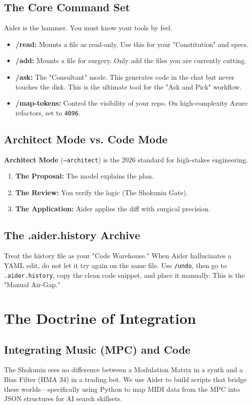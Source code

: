 \documentclass[11pt,a4paper,oneside]{book}
\begin{document}
\section{The Core Command Set}
Aider is the hammer. You must know your tools by feel.
\begin{itemize}
    \item \textbf{/read:} Mounts a file as read-only. Use this for your "Constitution" and specs.
    \item \textbf{/add:} Mounts a file for surgery. Only add the files you are currently cutting.
    \item \textbf{/ask:} The "Consultant" mode. This generates code in the chat but never touches the disk. This is the ultimate tool for the "Ask and Pick" workflow.
    \item \textbf{/map-tokens:} Control the visibility of your repo. On high-complexity Azure refactors, set to \texttt{4096}.
\end{itemize}

\section{Architect Mode vs. Code Mode}
\textbf{Architect Mode} (\texttt{--architect}) is the 2026 standard for high-stakes engineering.
\begin{enumerate}
    \item \textbf{The Proposal:} The model explains the plan.
    \item \textbf{The Review:} You verify the logic (The Shokunin Gate).
    \item \textbf{The Application:} Aider applies the diff with surgical precision.
\end{enumerate}

\section{The .aider.history Archive}
Treat the history file as your "Code Warehouse." When Aider hallucinates a YAML edit, do not let it try again on the same file. Use \texttt{/undo}, then go to \texttt{.aider.history}, copy the clean code snippet, and place it manually. This is the "Manual Air-Gap."

\chapter{The Doctrine of Integration}
\section{Integrating Music (MPC) and Code}
The Shokunin sees no difference between a Modulation Matrix in a synth and a Bias Filter (HMA 34) in a trading bot. We use Aider to build scripts that bridge these worlds—specifically using Python to map MIDI data from the MPC into JSON structures for AI search skillsets.
\end{document}
